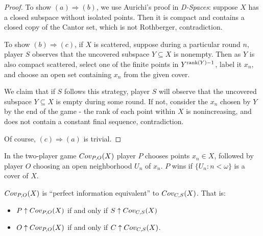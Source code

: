   \begin{proof}
    To show $(a)\Rightarrow(b)$, we use Aurichi's proof in \textit{D-Spaces}: suppose $X$ has a closed subspace without isolated points. Then it is compact and contains a closed copy of the Cantor set, which is not Rothberger, contradiction.

    To show $(b)\Rightarrow(c)$, if $X$ is scattered, suppose during a particular round $n$, player $S$ observes that the uncovered subspace $Y \subseteq X$ is nonempty. Then as $Y$ is also compact scattered,  select one of the finite points in $Y^{\textrm{rank}(Y)-1}$, label it $x_n$, and choose an open set containing $x_n$ from the given cover.

    We claim that if $S$ follows this strategy, player $S$ will observe that the uncovered subspace $Y\subseteq X$ is empty during some round. If not, consider the $x_n$ chosen by $Y$ by the end of the game - the rank of each point within $X$ is nonincreasing, and does not contain a constant final sequence, contradiction.

    Of course, $(c)\Rightarrow(a)$ is trivial.
  \end{proof}

  \begin{definition}
    In the two-player game $Cov_{P,O}(X)$ player $P$ chooses points $x_n\in X$, followed by player $O$ choosing an open neighborhood $U_n$ of $x_n$. $P$ wins if $\{U_n:n<\omega\}$ is a cover of $X$.
  \end{definition}

  \begin{theorem} $Cov_{P,O}(X)$ is ``perfect information equivalent'' to $Cov_{C,S}(X)$. That is:

    \begin{itemize}
      \item $P\uparrow Cov_{P,O}(X)$ if and only if $S\uparrow Cov_{C,S}(X)$
      \item $O\uparrow Cov_{P,O}(X)$ if and only if $C\uparrow Cov_{C,S}(X)$.
    \end{itemize}
  \end{theorem}

